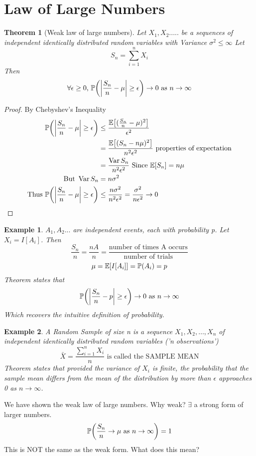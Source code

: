 \documentclass{notes}
\theoremstyle{plain}
\newtheorem{theorem}{Theorem}[chapter]
\newtheorem*{example}{Example}
\newcommand{\bP}{\mathbb{P}}
\newcommand{\bE}{\mathbb{E}}
\newcommand{\prob}[1]{\bP \negthinspace\left(#1\right)}
\newcommand{\expect}[1]{\bE\!\left[#1\right]}
\DeclareMathOperator{\var}{Var}
\begin{document}
\section{Law of Large Numbers}
\begin{theorem}[Weak law of large numbers]
Let $X_1,X_2.....$ be a sequences of independent identically distributed random
variables with Variance $\sigma^2 \le \infty$ Let
\[
S_n = \sum_{i=1}^n X_i
\]
Then
\[
\forall \epsilon \ge 0\text{, }\prob{\abs{\frac{S_n}{n} - \mu} \geq \epsilon}
\to 0 \text{ as } n \to \infty
\]
\end{theorem}
\begin{proof}
By Chebyshev's Inequality
\begin{align*}
\prob{\abs{\frac{S_n}{n} - \mu}\geq \epsilon} &\leq 
\frac{\expect{(\frac{S_n}{n} - \mu)^2}}{\epsilon^2}\\
&= \frac{\expect{(S_n - n\mu)^2}}{n^2\epsilon^2}
 \text{ properties of expectation}\\
&= \frac {\var S_n}{n^2\epsilon^2} \text{ Since $ \expect{S_n}=n\mu$}\\
\text{But } \var S_n &= n\sigma^2\\
\text{Thus } \prob{\abs{\frac{S_n}{n} - \mu}\geq \epsilon}&\leq 
\frac{ n\sigma^2}{n^2\epsilon^2} = \frac{\sigma^2}{n\epsilon^2} \to 0
\end{align*}
\end{proof}
\begin{example}
$A_1,A_2...$ are independent events, each with probability p. Let $X_i=I[A_i]$.
Then
\[
\frac{S_n}{n} = \frac{nA}{n} = 
\frac{\text{number of times A occurs}}{\text{number of trials}}
\]
\[
\mu = \expect{I[A_i]} = \prob{A_i} = p
\]
Theorem states that 
\[
\prob{\abs{\frac{S_n}{n} - p} \geq \epsilon} \to 0 \text{ as } n \to \infty
\]
Which recovers the intuitive definition of probability.
\end{example}
\begin{example}
A Random Sample of size n is a sequence $X_1,X_2,\dots,X_n$ of independent 
identically distributed random variables ('n observations')
\[
\bar{X} = \frac{\sum_{i=1}^n X_i}{n} \text{ is called the SAMPLE MEAN}
\] 
Theorem states that provided the variance of $X_i$ is finite, the probability 
that the sample mean differs from the mean of the distribution by more than
 $\epsilon$ approaches 0 as $n \to \infty$.
\end{example}
We have shown the weak law of large numbers. Why weak?\hfill
$\exists$ a strong form of larger numbers.
\[
\prob{\frac{S_n}{n} \to \mu \text{ as } n\to\infty} = 1
\]
This is NOT the same as the weak form. What does this mean?
\end{document}
